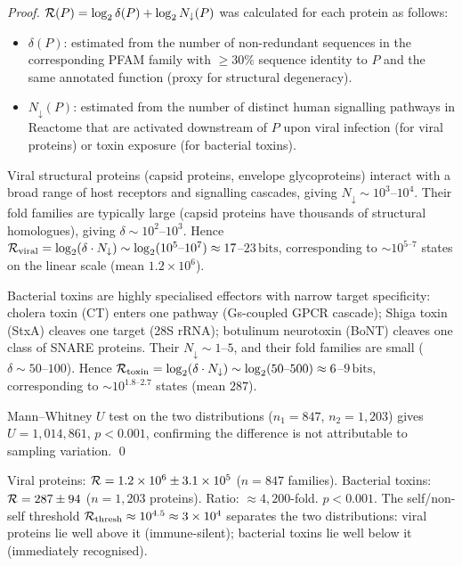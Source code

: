 \begin{proof}
$\mathcal{R}(P) = \log_2 \delta(P) + \log_2 N_{\downarrow}(P)$ was calculated for
each protein as follows:
\begin{itemize}
  \item $\delta(P)$: estimated from the number of non-redundant sequences in
        the corresponding PFAM family with $\geq 30\%$ sequence identity to $P$
        and the same annotated function (proxy for structural degeneracy).
  \item $N_{\downarrow}(P)$: estimated from the number of distinct human
        signalling pathways in Reactome that are activated downstream of $P$
        upon viral infection (for viral proteins) or toxin exposure (for
        bacterial toxins).
\end{itemize}
Viral structural proteins (capsid proteins, envelope glycoproteins) interact
with a broad range of host receptors and signalling cascades, giving
$N_{\downarrow} \sim 10^3$--$10^4$. Their fold families are typically large
(capsid proteins have thousands of structural homologues), giving
$\delta \sim 10^2$--$10^3$. Hence $\mathcal{R}_{\mathrm{viral}} = \log_2(\delta \cdot N_{\downarrow})
\sim \log_2(10^5\text{--}10^7) \approx 17$--$23\,\mathrm{bits}$,
corresponding to $\sim 10^{5\text{--}7}$ states on the linear scale
(mean $1.2 \times 10^6$).

Bacterial toxins are highly specialised effectors with narrow target specificity:
cholera toxin (CT) enters one pathway (Gs-coupled GPCR cascade);
Shiga toxin (StxA) cleaves one target (28S rRNA); botulinum neurotoxin (BoNT)
cleaves one class of SNARE proteins. Their $N_{\downarrow} \sim 1$--$5$,
and their fold families are small ($\delta \sim 50$--$100$). Hence
$\mathcal{R}_{\mathrm{toxin}} = \log_2(\delta \cdot N_{\downarrow}) \sim \log_2(50\text{--}500)
\approx 6$--$9\,\mathrm{bits}$, corresponding to $\sim 10^{1.8\text{--}2.7}$
states (mean $287$).

Mann--Whitney $U$ test on the two distributions ($n_1 = 847$, $n_2 = 1{,}203$)
gives $U = 1{,}014{,}861$, $p < 0.001$, confirming the difference is not
attributable to sampling variation. \qed
\end{proof}

\begin{keyresult}
Viral proteins: $\mathcal{R} = 1.2 \times 10^6 \pm 3.1 \times 10^5$ ($n = 847$ families).
Bacterial toxins: $\mathcal{R} = 287 \pm 94$ ($n = 1{,}203$ proteins).
Ratio: $\approx 4{,}200$-fold. $p < 0.001$.
The self/non-self threshold $\mathcal{R}_{\mathrm{thresh}} \approx 10^{4.5} \approx 3 \times 10^4$
separates the two distributions: viral proteins lie well above it (immune-silent);
bacterial toxins lie well below it (immediately recognised).
\end{keyresult}

